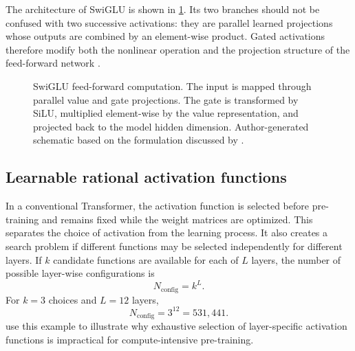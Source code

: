 The architecture of SwiGLU is shown in \cref{fig:act-swiglu}. Its two
branches should not be confused with two successive activations: they are
parallel learned projections whose outputs are combined by an
element-wise product. Gated activations therefore modify both the
nonlinear operation and the projection structure of the feed-forward
network \parencite{zhuo2025polycom,lukac2026llms}.

\begin{figure}[htbp]
    \centering
    
    \caption{SwiGLU feed-forward computation. The input is mapped through
    parallel value and gate projections. The gate is transformed by SiLU,
    multiplied element-wise by the value representation, and projected
    back to the model hidden dimension. Author-generated schematic based
    on the formulation discussed by \textcite{zhuo2025polycom}.}
    \label{fig:act-swiglu}
\end{figure}

\subsection{Learnable rational activation functions}
\label{subsec:act-raf}

In a conventional Transformer, the activation function is selected before
pre-training and remains fixed while the weight matrices are optimized.
This separates the choice of activation from the learning process. It
also creates a search problem if different functions may be selected
independently for different layers. If \(k\) candidate functions are
available for each of \(L\) layers, the number of possible layer-wise
configurations is
\begin{equation}
    N_{\mathrm{config}}=k^L.
    \label{eq:act-search-space}
\end{equation}
For \(k=3\) choices and \(L=12\) layers,
\begin{equation}
    N_{\mathrm{config}}=3^{12}=531{,}441.
    \label{eq:act-search-numeric}
\end{equation}
\textcite{fang2023raft} use this example to illustrate why exhaustive
selection of layer-specific activation functions is impractical for
compute-intensive pre-training.

